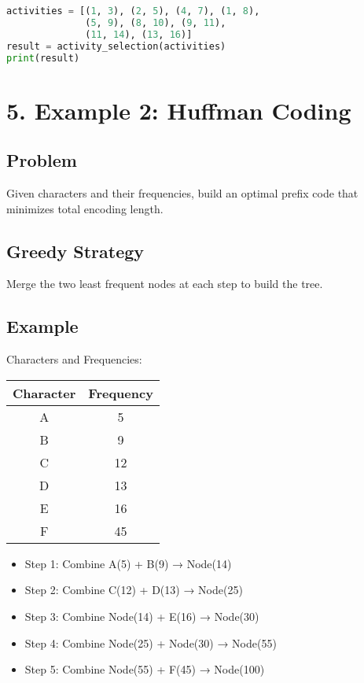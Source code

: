 \documentclass[14pt]{extarticle}
\begin{document}
\begin{lstlisting}[language=Python]
activities = [(1, 3), (2, 5), (4, 7), (1, 8),
              (5, 9), (8, 10), (9, 11), 
              (11, 14), (13, 16)]
result = activity_selection(activities)
print(result)
\end{lstlisting}


\section*{5. Example 2: Huffman Coding}

\subsection*{Problem}
Given characters and their frequencies, build an optimal prefix code that minimizes total encoding length.

\subsection*{Greedy Strategy}
Merge the two least frequent nodes at each step to build the tree.

\subsection*{Example}

Characters and Frequencies:

\begin{center}
\begin{tabular}{|c|c|}
\hline
Character & Frequency \\
\hline
A & 5 \\
B & 9 \\
C & 12 \\
D & 13 \\
E & 16 \\
F & 45 \\
\hline
\end{tabular}
\end{center}

\begin{itemize}
    \item Step 1: Combine A(5) + B(9) → Node(14)
    \item Step 2: Combine C(12) + D(13) → Node(25)
    \item Step 3: Combine Node(14) + E(16) → Node(30)
    \item Step 4: Combine Node(25) + Node(30) → Node(55)
    \item Step 5: Combine Node(55) + F(45) → Node(100)
\end{itemize}
\end{document}
